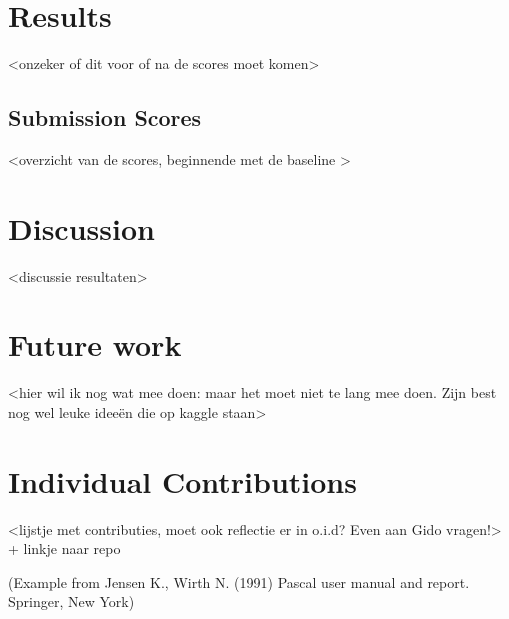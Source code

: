 \documentclass[runningheads,a4paper]{llncs}
\begin{document}
\section{Results}
<onzeker of dit voor of na de scores moet komen>
\subsection{Submission Scores}
<overzicht van de scores, beginnende met de baseline >
\section{Discussion}
<discussie resultaten>
\section{Future work}
<hier wil ik nog wat mee doen: maar het moet niet te lang mee doen. Zijn best nog wel leuke ideeën die op kaggle staan>
\section{Individual Contributions}
<lijstje met contributies, moet ook reflectie er in o.i.d? Even aan Gido vragen!>
+ linkje naar repo
\medskip


{\small (Example from Jensen K., Wirth N. (1991) Pascal user manual and
report. Springer, New York)}


\nocite{*} 
\end{document}
